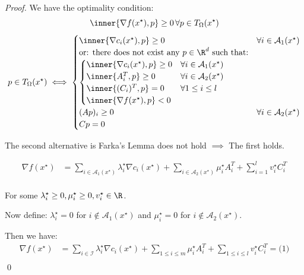 \begin{proof}{}{}
	We have the optimality condition:
	\[
		\inner{\nabla f(x^\star), p} \geq 0 \, \forall p \in T_{\Omega}(x^\star)
	\]
	\medskip
	\begin{align*}
		p \in T_{\Omega}(x^\star) \iff
		\begin{cases}
			\inner{\nabla c_i (x^\star), p }\geq 0                             & \forall i \in \mathcal{A}_1(x^\star) \\
			\text{or: there does not exist any } p \in \R^d \text{ such that:} &                                      \\
			\begin{cases}
				\inner{\nabla c_i (x^\star), p }\geq 0 & \forall i \in \mathcal{A}_1(x^\star) \\
				\inner{A_i^T , p }\geq 0               & \forall i \in \mathcal{A}_2(x^\star) \\
				\inner{ (C_i )^T, p } = 0              & \forall 1 \leq i \leq l              \\
				\inner{\nabla f (x^\star), p } < 0     &
			\end{cases}                             \\
			(Ap)_i \geq 0                                                      & \forall i \in \mathcal{A}_2(x^\star) \\
			Cp = 0                                                             &
		\end{cases}
	\end{align*}

	The second alternative is Farka's Lemma does not hold \(\implies\) The first holds.

	\begin{align*}
		\nabla f(x^\star) & = \sum_{i\in \mathcal{A}_1(x^\star)} \lambda_i^\star \nabla c_i(x^\star) + \sum_{i \in \mathcal{A}_2(x^\star)} \mu_i^\star A_i^T + \sum_{i=1}^l v_i^\star C_i^T \\
	\end{align*}

	For some  \(\lambda_i^\star \geq 0, \mu_i^\star \geq 0, v_i^\star \in \R\).

	Now define: \(\lambda_i^\star = 0 \) for \(i \notin \mathcal{A}_1(x^\star)\) and \(\mu_i^\star = 0\) for \(i \notin \mathcal{A}_2(x^\star)\).

	Then we have:
	\begin{align*}
		\nabla f(x^\star) & = \sum_{i\in \mathcal{I}} \lambda_i^\star \nabla c_i(x^\star) + \sum_{1 \leq i \leq m} \mu_i^\star A_i^T + \sum_{1 \leq i \leq l} v_i^\star C_i^T = \text{(1)} \\
	\end{align*}
	\qed
\end{proof}

